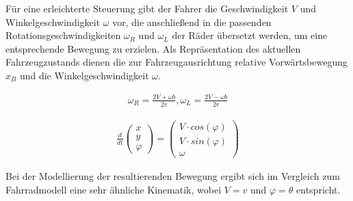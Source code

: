Für eine erleichterte Steuerung gibt der Fahrer die Geschwindigkeit $V$ und
Winkelgeschwindigkeit $\omega$ vor, die anschließend in die passenden
Rotationsgeschwindigkeiten $\omega_R$ und $\omega_L$ der Räder übersetzt werden,
um eine entsprechende Bewegung zu erzielen. Als Repräsentation des aktuellen
Fahrzeugzustands dienen die zur Fahrzeugausrichtung relative Vorwärtsbewegung $x_B$
und die Winkelgeschwindigkeit $\omega$.

\begin{equation}
\begin{aligned}
\omega_R = \frac{2V + \omega b}{2r}, \omega_L = \frac{2V - \omega b}{2r}
\end{aligned}
\end{equation}

\begin{equation}
\begin{aligned}
\frac{d}{dt} \begin{pmatrix} x \\ y \\ \varphi \end{pmatrix}
= \begin{pmatrix} V \cdot cos(\varphi) \\ V \cdot sin(\varphi) \\ \omega \end{pmatrix}
\end{aligned}
\end{equation}

Bei der Modellierung der resultierenden Bewegung ergibt sich im Vergleich zum
Fahrradmodell eine sehr ähnliche Kinematik, wobei $V = v$ und $\varphi = \theta$
entspricht.

